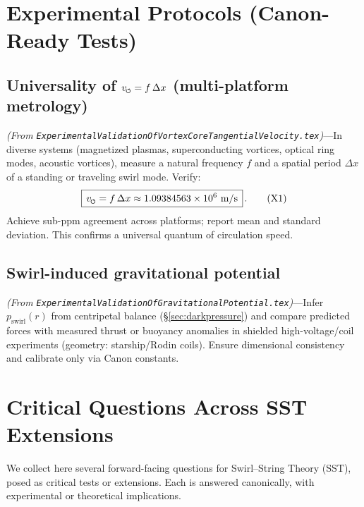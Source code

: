 \documentclass[11pt]{article}
\begin{document}
\section{Experimental Protocols (Canon-Ready Tests)}
\label{sec:experiments}
\subsection*{Universality of $\vscore = f\,\Delta x$ (multi-platform metrology)}
    \textit{(From \texttt{ExperimentalValidationOfVortexCoreTangentialVelocity.tex})}—In diverse systems (magnetized plasmas, superconducting vortices, optical ring modes, acoustic vortices), measure a natural frequency $f$ and a spatial period $\Delta x$ of a standing or traveling swirl mode. Verify:
    \begin{equation}
    \boxed{\,\vscore = f\,\Delta x \approx 1.09384563\times10^{6}\ \mathrm{m/s}\,}\,. \tag{X1}
    \end{equation}
    Achieve sub-ppm agreement across platforms; report mean and standard deviation. This confirms a universal quantum of circulation speed.

\subsection*{Swirl-induced gravitational potential}
    \textit{(From \texttt{ExperimentalValidationOfGravitationalPotential.tex})}—Infer $p_{\text{swirl}}(r)$ from centripetal balance (\S\ref{sec:darkpressure}) and compare predicted forces with measured thrust or buoyancy anomalies in shielded high-voltage/coil experiments (geometry: starship/Rodin coils). Ensure dimensional consistency and calibrate only via Canon constants.

\section{Critical Questions Across SST Extensions}
\label{sec:critical-questions}
We collect here several forward-facing questions for Swirl–String Theory (SST), posed as critical tests or extensions. Each is answered canonically, with experimental or theoretical implications.
\end{document}
